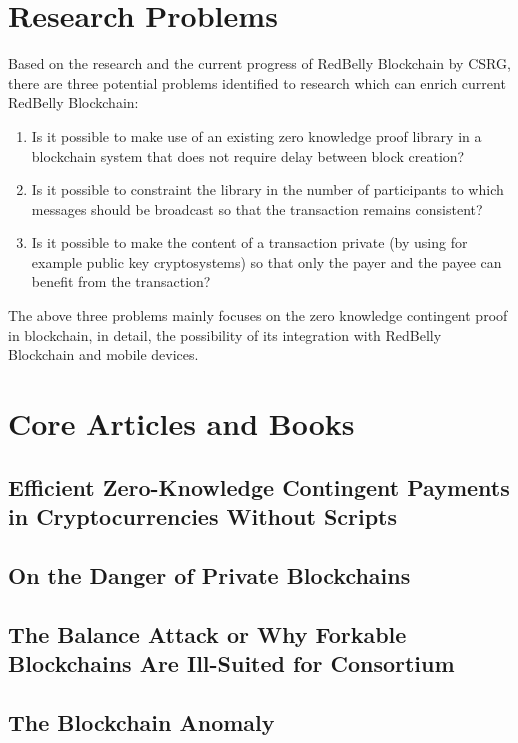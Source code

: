 \section{Research Problems}
\label{sec:research problems}

Based on the research and the current progress of RedBelly Blockchain by CSRG, there are three potential problems identified to research which can enrich current RedBelly Blockchain:

\begin{enumerate}
\item Is it possible to make use of an existing zero knowledge proof library in a blockchain system that does not require delay between block creation?
\item Is it possible to constraint the library in the number of participants to which messages should be broadcast so that the transaction remains consistent?
\item Is it possible to make the content of a transaction private (by using for example public key cryptosystems) so that only the payer and the payee can benefit from the transaction?
\end{enumerate}
The above three problems mainly focuses on the zero knowledge contingent proof in blockchain, in detail, the possibility of its integration with RedBelly Blockchain and mobile devices.

\section{Core Articles and Books}
\label{sec:core articles and books}

\subsection{Efficient Zero-Knowledge Contingent Payments in Cryptocurrencies Without Scripts\cite{Banasik2016}}

\subsection{On the Danger of Private Blockchains\cite{Gra16}}

\subsection{The Balance Attack or Why Forkable Blockchains Are Ill-Suited for Consortium\cite{NG17}}

\subsection{The Blockchain Anomaly\cite{NG16}}

